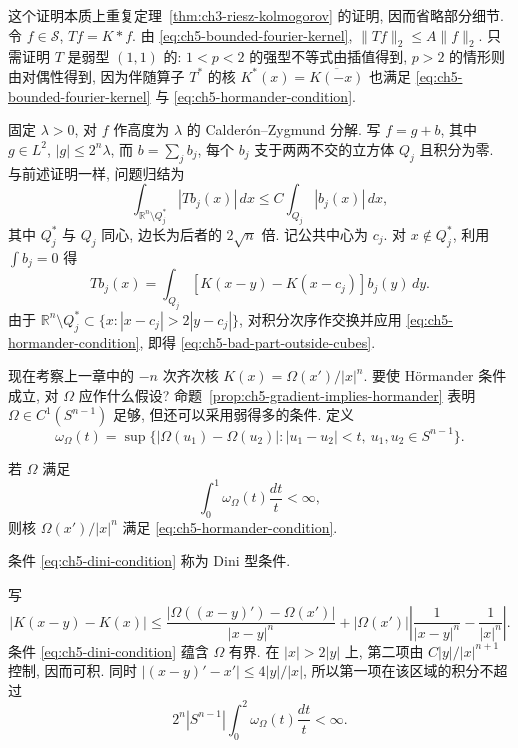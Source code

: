 \begin{Proof}
这个证明本质上重复定理~\ref{thm:ch3-riesz-kolmogorov} 的证明, 因而省略部分细节. 令 $f\in\mathcal S$, $Tf=K*f$. 由 \eqref{eq:ch5-bounded-fourier-kernel}, $\|Tf\|_2\le A\|f\|_2$. 只需证明 $T$ 是弱型 $(1,1)$ 的: $1<p<2$ 的强型不等式由插值得到, $p>2$ 的情形则由对偶性得到, 因为伴随算子 $T^*$ 的核 $K^*(x)=\overline{K(-x)}$ 也满足 \eqref{eq:ch5-bounded-fourier-kernel} 与 \eqref{eq:ch5-hormander-condition}.

固定 $\lambda>0$, 对 $f$ 作高度为 $\lambda$ 的 Calderón--Zygmund 分解. 写 $f=g+b$, 其中 $g\in L^2$, $|g|\le2^n\lambda$, 而 $b=\sum_jb_j$, 每个 $b_j$ 支于两两不交的立方体 $Q_j$ 且积分为零. 与前述证明一样, 问题归结为
\begin{equation}
\label{eq:ch5-bad-part-outside-cubes}
 \int_{\mathbb R^n\setminus Q_j^*}|Tb_j(x)|\,dx
 \le C\int_{Q_j}|b_j(x)|\,dx,
\end{equation}
其中 $Q_j^*$ 与 $Q_j$ 同心, 边长为后者的 $2\sqrt n$ 倍. 记公共中心为 $c_j$. 对 $x\notin Q_j^*$, 利用 $\int b_j=0$ 得
\[
 Tb_j(x)=\int_{Q_j}[K(x-y)-K(x-c_j)]b_j(y)\,dy.
\]
由于 $\mathbb R^n\setminus Q_j^*\subset\{x:|x-c_j|>2|y-c_j|\}$, 对积分次序作交换并应用 \eqref{eq:ch5-hormander-condition}, 即得 \eqref{eq:ch5-bad-part-outside-cubes}.
\end{Proof}

现在考察上一章中的 $-n$ 次齐次核 $K(x)=\Omega(x')/|x|^n$. 要使 Hörmander 条件成立, 对 $\Omega$ 应作什么假设? 命题~\ref{prop:ch5-gradient-implies-hormander} 表明 $\Omega\in C^1(S^{n-1})$ 足够, 但还可以采用弱得多的条件. 定义
\[
 \omega_\Omega(t)=\sup\{|\Omega(u_1)-\Omega(u_2)|:
 |u_1-u_2|<t,\ u_1,u_2\in S^{n-1}\}.
\]

\hypertarget{chapter-05-page-105}{}
\begin{Proposition}
\label{prop:ch5-dini-implies-hormander}
若 $\Omega$ 满足
\begin{equation}
\label{eq:ch5-dini-condition}
 \int_0^1\omega_\Omega(t)\frac{dt}{t}<\infty,
\end{equation}
则核 $\Omega(x')/|x|^n$ 满足 \eqref{eq:ch5-hormander-condition}.
\end{Proposition}

条件 \eqref{eq:ch5-dini-condition} 称为 Dini 型条件.

\begin{Proof}
写
\[
 |K(x-y)-K(x)|
 \le\frac{|\Omega((x-y)')-\Omega(x')|}{|x-y|^n}
 +|\Omega(x')|\left|\frac1{|x-y|^n}-\frac1{|x|^n}\right|.
\]
条件 \eqref{eq:ch5-dini-condition} 蕴含 $\Omega$ 有界. 在 $|x|>2|y|$ 上, 第二项由 $C|y|/|x|^{n+1}$ 控制, 因而可积. 同时 $|(x-y)'-x'|\le4|y|/|x|$, 所以第一项在该区域的积分不超过
\[
 2^n|S^{n-1}|\int_0^2\omega_\Omega(t)\frac{dt}{t}<\infty.
\]
\end{Proof}

